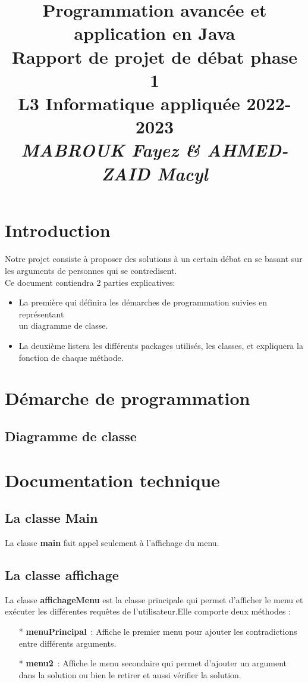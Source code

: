 \documentclass[12pt]{article}
\date{}
\title{{\bf Programmation avancée et application en {\sf Java}} \\
	Rapport de projet de débat phase 1 \\
	{\small L3 Informatique appliquée 2022-2023} \\
	{\it \small MABROUK Fayez \& AHMED-ZAID Macyl}}
\theoremstyle{definition}
\begin{document}
	
	\maketitle
	\newpage
	\section{Introduction}
	\paragraph {}
	Notre projet consiste à proposer des solutions à un certain débat en se basant sur les arguments de
	personnes qui se contredisent.\\
	Ce document contiendra 2 parties explicatives: 
	\begin{itemize}
		\item La première qui définira les démarches de programmation suivies en représentant\\ un
		diagramme de classe.
		\item  La deuxième listera les différents packages utilisés, les classes, et expliquera la fonction de
		chaque méthode.
	\end{itemize}
	\section{Démarche de programmation}
	\subsection{Diagramme de classe}
	\section{Documentation technique}
	\subsection{La classe Main}
	La classe \textbf{main} fait appel seulement à l’affichage du menu.
	\subsection{La classe affichage}
	La classe \textbf{affichageMenu} est la classe principale qui permet d’afficher le menu et exécuter les
	différentes requêtes de l’utilisateur.Elle comporte deux méthodes :
	\begin{itemize}
		\item [*] \textbf{menuPrincipal} : Affiche le premier menu pour ajouter les contradictions entre différents arguments.
		\item [*] \textbf{menu2} : Affiche le menu secondaire qui permet d’ajouter un argument dans la solution ou
		bien le retirer et aussi vérifier la solution.
	\end{itemize}
\end{document}
